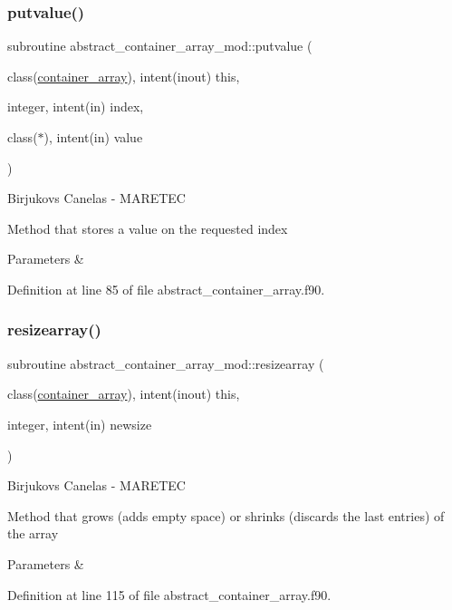 \subsubsection{\texorpdfstring{putvalue()}{putvalue()}}
{\footnotesize\ttfamily subroutine abstract\+\_\+container\+\_\+array\+\_\+mod\+::putvalue (\begin{DoxyParamCaption}\item[{class(\hyperlink{structabstract__container__array__mod_1_1container__array}{container\+\_\+array}), intent(inout)}]{this,  }\item[{integer, intent(in)}]{index,  }\item[{class($\ast$), intent(in)}]{value }\end{DoxyParamCaption})\hspace{0.3cm}{\ttfamily [private]}}



Birjukovs Canelas -\/ M\+A\+R\+E\+T\+EC 

Method that stores a value on the requested index 
\begin{DoxyParams}{Parameters}
{\em } & \\
\hline
\end{DoxyParams}


Definition at line 85 of file abstract\+\_\+container\+\_\+array.\+f90.

\mbox{\label{namespaceabstract__container__array__mod_ac2d73eb111ffde938f81e3f93b0cb3e0}} 
\subsubsection{\texorpdfstring{resizearray()}{resizearray()}}
{\footnotesize\ttfamily subroutine abstract\+\_\+container\+\_\+array\+\_\+mod\+::resizearray (\begin{DoxyParamCaption}\item[{class(\hyperlink{structabstract__container__array__mod_1_1container__array}{container\+\_\+array}), intent(inout)}]{this,  }\item[{integer, intent(in)}]{newsize }\end{DoxyParamCaption})\hspace{0.3cm}{\ttfamily [private]}}



Birjukovs Canelas -\/ M\+A\+R\+E\+T\+EC 

Method that grows (adds empty space) or shrinks (discards the last entries) of the array 
\begin{DoxyParams}{Parameters}
{\em } & \\
\hline
\end{DoxyParams}


Definition at line 115 of file abstract\+\_\+container\+\_\+array.\+f90.


